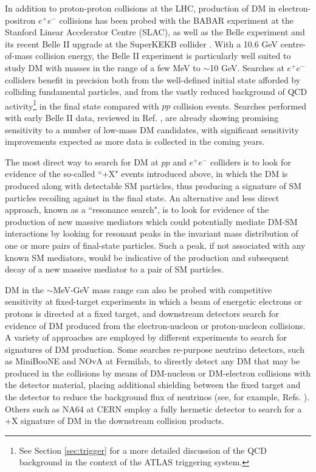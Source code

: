 In addition to proton-proton collisions at the LHC, production of DM in electron-positron \(e^+e^-\) collisions has been probed with the BABAR experiment \cite{babar_2002} at the Stanford Linear Accelerator Centre (SLAC), as well as the Belle experiment \cite{belle_detector_2002} and its recent Belle II upgrade \cite{belle_II_2018} at the SuperKEKB collider \cite{superkekb_2018}. With a 10.6 GeV centre-of-mass collision energy, the Belle II experiment is particularly well suited to study DM with masses in the range of a few MeV to \(\sim\)10 GeV. Searches at \(e^+e^-\) colliders benefit in precision both from the well-defined initial state afforded by colliding fundamental particles, and from the vastly reduced background of QCD activity\footnote{See Section \ref{sec:trigger} for a more detailed discussion of the QCD background in the context of the ATLAS triggering system.} in the final state compared with \(pp\) collision events. Searches performed with early Belle II data, reviewed in Ref. \cite{Campajola_2021}, are already showing promising sensitivity to a number of low-mass DM candidates, with significant sensitivity improvements expected as more data is collected in the coming years.

The most direct way to search for DM at \(pp\) and \(e^+e^-\) colliders is to look for evidence of the so-called ``\met+X" events introduced above, in which the DM is produced along with detectable SM particles, thus producing a signature of SM particles recoiling against \met in the final state. An alternative and less direct approach, known as a ``resonance search", is to look for evidence of the production of new massive mediators which could potentially mediate DM-SM interactions by looking for resonant peaks in the invariant mass distribution of one or more pairs of final-state particles. Such a peak, if not associated with any known SM mediators, would be indicative of the production and subsequent decay of a new massive mediator to a pair of SM particles.

DM in the \(\sim\)MeV-GeV mass range can also be probed with competitive sensitivity at fixed-target experiments in which a beam of energetic electrons or protons is directed at a fixed target, and downstream detectors search for evidence of DM produced from the electron-nucleon or proton-nucleon collisions. A variety of approaches are employed by different experiments to search for signatures of DM production. Some searches re-purpose neutrino detectors, such as MiniBooNE \cite{ray2007miniboone} and NOvA \cite{nova_2012} at Fermilab, to directly detect any DM that may be produced in the collisions by means of DM-nucleon or DM-electron collisions with the detector material, placing additional shielding between the fixed target and the detector to reduce the background flux of neutrinos (see, for example, Refs. \cite{miniboone_2018,nova_dm_2019}). Others such as NA64 \cite{na64_2019} at CERN employ a fully hermetic detector to search for a \met+X signature of DM in the downstream collision products.

